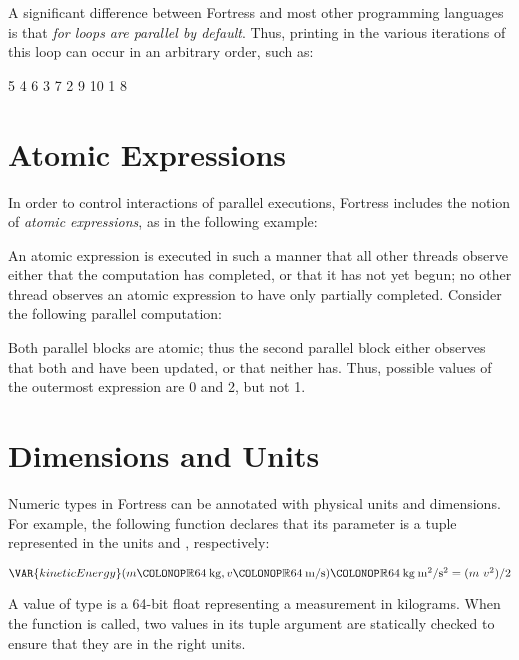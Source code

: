 A significant difference between Fortress
and most other programming languages
is that \emph{for loops are parallel by default}.
Thus, printing in the various iterations
of this loop can occur in an arbitrary order, such as:

5 4 6 3 7 2 9 10 1 8

\section{Atomic Expressions}

In order to control interactions of parallel executions, Fortress
includes the notion of \emph{atomic expressions}, as in the following
example:



An atomic expression
is executed in such a manner that all other threads observe either that
the computation has completed, or that it has not yet begun; no other
thread observes an atomic expression to have only partially completed.
Consider the following parallel computation:


Both parallel blocks are atomic; thus the second parallel block either
observes that both  and  have been updated, or that
neither has. Thus, possible values of the outermost 
expression are 0 and 2, but not 1.

\section{Dimensions and Units}

Numeric types in Fortress can be annotated with physical units and
dimensions. For example, the following function declares that its
parameter is a tuple represented in the units  and
,
respectively:

\begin{Fortress}
\(\VAR{kineticEnergy}(m\COLONOP\mathbb{R}64\mskip 4mu plus 4mu\mathrm{kg}, v\COLONOP\mathbb{R}64\mskip 4mu plus 4mu\mathrm{m}/\mathrm{s})\COLONOP\mathbb{R}64\mskip 4mu plus 4mu\mathrm{kg}\mskip 4mu plus 4mu\mathrm{m}^{2}/\mathrm{s}^{2} = (m\ v^{2}) / 2\)
\end{Fortress}

A value of type  is a
64-bit float representing a measurement in kilograms.
When the function  is called, two values in its tuple
argument are statically checked to ensure that they are in the right units.

